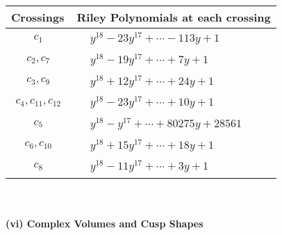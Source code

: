 \documentclass[1p]{elsarticle_modified}
\theoremstyle{definition}
\begin{document}
\begin{tabular}{m{50pt}|m{274pt}}
Crossings & \hspace{64pt}Riley Polynomials at each crossing \\
\hline $$\begin{aligned}c_{1}\end{aligned}$$&$\begin{aligned}
&y^{18}-23 y^{17}+\cdots-113 y+1
\end{aligned}$\\
\hline $$\begin{aligned}c_{2},c_{7}\end{aligned}$$&$\begin{aligned}
&y^{18}-19 y^{17}+\cdots+7 y+1
\end{aligned}$\\
\hline $$\begin{aligned}c_{3},c_{9}\end{aligned}$$&$\begin{aligned}
&y^{18}+12 y^{17}+\cdots+24 y+1
\end{aligned}$\\
\hline $$\begin{aligned}c_{4},c_{11},c_{12}\end{aligned}$$&$\begin{aligned}
&y^{18}-23 y^{17}+\cdots+10 y+1
\end{aligned}$\\
\hline $$\begin{aligned}c_{5}\end{aligned}$$&$\begin{aligned}
&y^{18}- y^{17}+\cdots+80275 y+28561
\end{aligned}$\\
\hline $$\begin{aligned}c_{6},c_{10}\end{aligned}$$&$\begin{aligned}
&y^{18}+15 y^{17}+\cdots+18 y+1
\end{aligned}$\\
\hline $$\begin{aligned}c_{8}\end{aligned}$$&$\begin{aligned}
&y^{18}-11 y^{17}+\cdots+3 y+1
\end{aligned}$\\
\hline
\end{tabular}\\~\\
\newpage\flushleft \textbf{(vi) Complex Volumes and Cusp Shapes}
\end{document}
